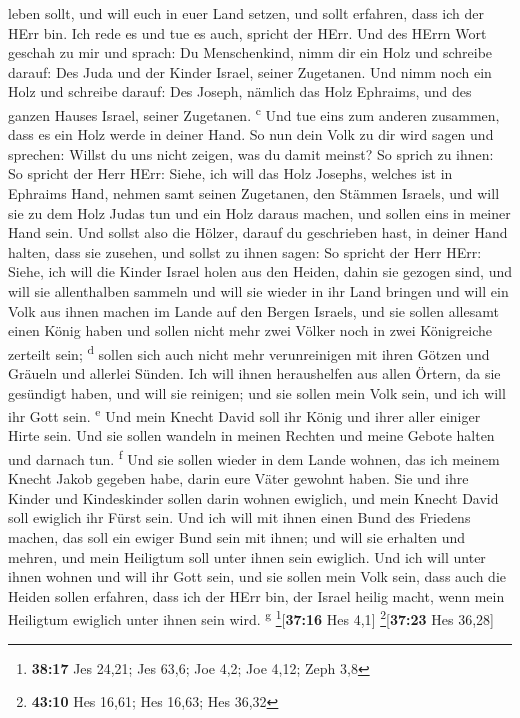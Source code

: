 leben sollt, und will euch in euer Land setzen, und sollt erfahren, dass
ich der HErr bin. Ich rede es und tue es auch, spricht der HErr.
 Und des HErrn Wort geschah zu mir und sprach:
 Du Menschenkind, nimm dir ein Holz und schreibe darauf:
Des Juda und der Kinder Israel, seiner Zugetanen. Und nimm noch ein Holz
und schreibe darauf: Des Joseph, nämlich das Holz Ephraims, und des
ganzen Hauses Israel, seiner Zugetanen. \textsuperscript{c}
 Und tue eins zum anderen zusammen, dass es ein Holz
werde in deiner Hand.  So nun dein Volk zu dir wird sagen
und sprechen: Willst du uns nicht zeigen, was du damit meinst?
 So sprich zu ihnen: So spricht der Herr HErr: Siehe, ich
will das Holz Josephs, welches ist in Ephraims Hand, nehmen samt seinen
Zugetanen, den Stämmen Israels, und will sie zu dem Holz Judas tun und
ein Holz daraus machen, und sollen eins in meiner Hand sein.
 Und sollst also die Hölzer, darauf du geschrieben hast,
in deiner Hand halten, dass sie zusehen,  und sollst zu
ihnen sagen: So spricht der Herr HErr: Siehe, ich will die Kinder Israel
holen aus den Heiden, dahin sie gezogen sind, und will sie allenthalben
sammeln und will sie wieder in ihr Land bringen  und will
ein Volk aus ihnen machen im Lande auf den Bergen Israels, und sie
sollen allesamt einen König haben und sollen nicht mehr zwei Völker noch
in zwei Königreiche zerteilt sein; \textsuperscript{d} 
sollen sich auch nicht mehr verunreinigen mit ihren Götzen und Gräueln
und allerlei Sünden. Ich will ihnen heraushelfen aus allen Örtern, da
sie gesündigt haben, und will sie reinigen; und sie sollen mein Volk
sein, und ich will ihr Gott sein. \textsuperscript{e} 
Und mein Knecht David soll ihr König und ihrer aller einiger Hirte sein.
Und sie sollen wandeln in meinen Rechten und meine Gebote halten und
darnach tun. \textsuperscript{f}  Und sie sollen wieder
in dem Lande wohnen, das ich meinem Knecht Jakob gegeben habe, darin
eure Väter gewohnt haben. Sie und ihre Kinder und Kindeskinder sollen
darin wohnen ewiglich, und mein Knecht David soll ewiglich ihr Fürst
sein.  Und ich will mit ihnen einen Bund des Friedens
machen, das soll ein ewiger Bund sein mit ihnen; und will sie erhalten
und mehren, und mein Heiligtum soll unter ihnen sein ewiglich.
 Und ich will unter ihnen wohnen und will ihr Gott sein,
und sie sollen mein Volk sein,  dass auch die Heiden
sollen erfahren, dass ich der HErr bin, der Israel heilig macht, wenn
mein Heiligtum ewiglich unter ihnen sein wird. \textsuperscript{g}
\footnote{\textbf{38:17} Jes 24,21; Jes 63,6; Joe 4,2; Joe 4,12; Zeph
  3,8}{[}\textbf{37:16} Hes 4,1{]} \footnote{\textbf{43:10} Hes 16,61;
  Hes 16,63; Hes 36,32}{[}\textbf{37:23} Hes 36,28{]}

